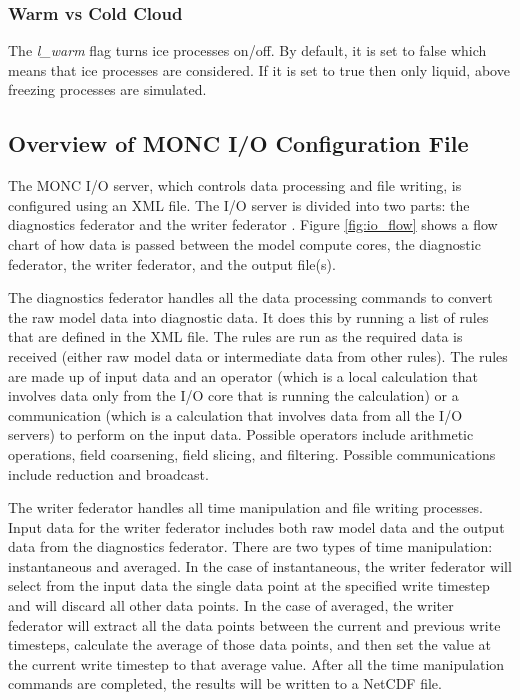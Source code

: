 \subsubsection{Warm vs Cold Cloud}
The \textit{l\_warm} flag turns ice processes on/off. By default, it is set to false which means that ice processes are considered. If it is set to true then only liquid, above freezing processes are simulated. \citep{casimCode}

\subsection{Overview of MONC I/O Configuration File} \label{sec:io}
The MONC I/O server, which controls data processing and file writing, is configured using an XML file. The I/O server is divided into two parts: the diagnostics federator and the writer federator \citep{brown2018,moncGuides}. Figure \ref{fig:io_flow} shows a flow chart of how data is passed between the model compute cores, the diagnostic federator, the writer federator, and the output file(s).

The diagnostics federator handles all the data processing commands to convert the raw model data into diagnostic data. It does this by running a list of rules that are defined in the XML file. The rules are run as the required data is received (either raw model data or intermediate data from other rules). The rules are made up of input data and an operator (which is a local calculation that involves data only from the I/O core that is running the calculation) or a communication (which is a calculation that involves data from all the I/O servers) to perform on the input data. Possible operators include arithmetic operations, field coarsening, field slicing, and filtering. Possible communications include reduction and broadcast. \citep{brown2018,moncGuides}

The writer federator handles all time manipulation and file writing processes. Input data for the writer federator includes both raw model data and the output data from the diagnostics federator. There are two types of time manipulation: instantaneous and averaged. In the case of instantaneous, the writer federator will select from the input data the single data point at the specified write timestep and will discard all other data points. In the case of averaged, the writer federator will extract all the data points between the current and previous write timesteps, calculate the average of those data points, and then set the value at the current write timestep to that average value. After all the time manipulation commands are completed, the results will be written to a NetCDF file. \citep{brown2018,moncGuides}

